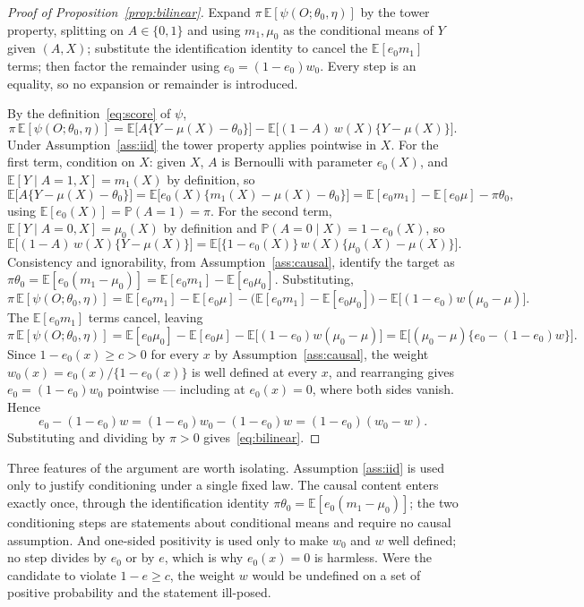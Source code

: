\documentclass[11pt]{article}
\theoremstyle{plain}
\theoremstyle{definition}
\theoremstyle{remark}
\newcommand{\E}{\mathbb{E}}
\newcommand{\PP}{\mathbb{P}}
\newcommand{\ez}{e_0}
\newcommand{\mz}{\mu_0}
\newcommand{\wz}{w_0}
\begin{document}
\begin{proof}[Proof of Proposition~\ref{prop:bilinear}]
Expand $\pi\,\E[\psi(O;\theta_0,\eta)]$ by the tower property, splitting on
$A\in\{0,1\}$ and using $m_1,\mz$ as the conditional means of $Y$ given $(A,X)$;
substitute the identification identity to cancel the $\E[\ez m_1]$ terms; then
factor the remainder using $\ez=(1-\ez)\wz$. Every step is an equality, so no
expansion or remainder is introduced.

By the definition~\eqref{eq:score} of $\psi$,
\[
  \pi\,\E[\psi(O;\theta_0,\eta)]
  =\E\bigl[A\{Y-\mu(X)-\theta_0\}\bigr]
  -\E\bigl[(1-A)\,w(X)\{Y-\mu(X)\}\bigr].
\]
Under Assumption~\ref{ass:iid} the tower property applies pointwise in $X$. For
the first term, condition on $X$: given $X$, $A$ is Bernoulli with parameter
$\ez(X)$, and $\E[Y\mid A=1,X]=m_1(X)$ by definition, so
\[
  \E\bigl[A\{Y-\mu(X)-\theta_0\}\bigr]
  =\E\bigl[\ez(X)\{m_1(X)-\mu(X)-\theta_0\}\bigr]
  =\E[\ez m_1]-\E[\ez\mu]-\pi\theta_0,
\]
using $\E[\ez(X)]=\PP(A=1)=\pi$. For the second term,
$\E[Y\mid A=0,X]=\mz(X)$ by definition and $\PP(A=0\mid X)=1-\ez(X)$, so
\[
  \E\bigl[(1-A)\,w(X)\{Y-\mu(X)\}\bigr]
  =\E\bigl[\{1-\ez(X)\}\,w(X)\{\mz(X)-\mu(X)\}\bigr].
\]
Consistency and ignorability, from Assumption~\ref{ass:causal}, identify the
target as $\pi\theta_0=\E[\ez(m_1-\mz)]=\E[\ez m_1]-\E[\ez\mz]$. Substituting,
\[
  \pi\,\E[\psi(O;\theta_0,\eta)]
  =\E[\ez m_1]-\E[\ez\mu]-\bigl(\E[\ez m_1]-\E[\ez\mz]\bigr)
  -\E\bigl[(1-\ez)w(\mz-\mu)\bigr].
\]
The $\E[\ez m_1]$ terms cancel, leaving
\[
  \pi\,\E[\psi(O;\theta_0,\eta)]
  =\E[\ez\mz]-\E[\ez\mu]-\E\bigl[(1-\ez)w(\mz-\mu)\bigr]
  =\E\bigl[(\mz-\mu)\{\ez-(1-\ez)w\}\bigr].
\]
Since $1-\ez(x)\ge c>0$ for every $x$ by Assumption~\ref{ass:causal}, the weight
$\wz(x)=\ez(x)/\{1-\ez(x)\}$ is well defined at every $x$, and rearranging gives
$\ez=(1-\ez)\wz$ pointwise --- including at $\ez(x)=0$, where both sides vanish.
Hence
\[
  \ez-(1-\ez)w=(1-\ez)\wz-(1-\ez)w=(1-\ez)(\wz-w).
\]
Substituting and dividing by $\pi>0$ gives~\eqref{eq:bilinear}.
\end{proof}

\noindent Three features of the argument are worth isolating. Assumption
\ref{ass:iid} is used only to justify conditioning under a single fixed law.
The causal content enters exactly once, through the identification identity
$\pi\theta_0=\E[\ez(m_1-\mz)]$; the two conditioning steps are statements about
conditional means and require no causal assumption. And one-sided positivity is
used only to make $\wz$ and $w$ well defined; no step divides by $\ez$ or by $e$,
which is why $\ez(x)=0$ is harmless. Were the candidate to violate $1-e\ge c$,
the weight $w$ would be undefined on a set of positive probability and the
statement ill-posed.
\end{document}

